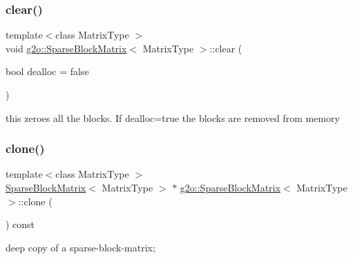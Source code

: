 \mbox{\label{classg2o_1_1_sparse_block_matrix_af14b7aaa588b339f2c06793fcc0d4e09}} 
\subsubsection{\texorpdfstring{clear()}{clear()}}
{\footnotesize\ttfamily template$<$class Matrix\+Type $>$ \\
void \mbox{\hyperlink{classg2o_1_1_sparse_block_matrix}{g2o\+::\+Sparse\+Block\+Matrix}}$<$ Matrix\+Type $>$\+::clear (\begin{DoxyParamCaption}\item[{bool}]{dealloc = {\ttfamily false} }\end{DoxyParamCaption})}



this zeroes all the blocks. If dealloc=true the blocks are removed from memory 

\mbox{\label{classg2o_1_1_sparse_block_matrix_aacf3c757056cfb81e510e3005a07278e}} 
\subsubsection{\texorpdfstring{clone()}{clone()}}
{\footnotesize\ttfamily template$<$class Matrix\+Type $>$ \\
\mbox{\hyperlink{classg2o_1_1_sparse_block_matrix}{Sparse\+Block\+Matrix}}$<$ Matrix\+Type $>$ $\ast$ \mbox{\hyperlink{classg2o_1_1_sparse_block_matrix}{g2o\+::\+Sparse\+Block\+Matrix}}$<$ Matrix\+Type $>$\+::clone (\begin{DoxyParamCaption}{ }\end{DoxyParamCaption}) const}



deep copy of a sparse-\/block-\/matrix; 

\mbox{\label{classg2o_1_1_sparse_block_matrix_a502857f0a792ad37055964705a983590}} 
